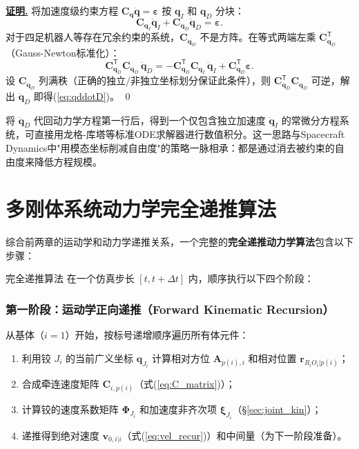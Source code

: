 \documentclass[10pt,a4paper]{book}
\theoremstyle{thmstyle}
\theoremstyle{defstyle}
\theoremstyle{prostyle}
\renewenvironment{proof}[1][证明]{\par{\kaishu \underline{\textbf{#1.}}} \;\fangsong}{\qed\par}
\newcommand{\T}{^{\mathsf{T}}}
\renewcommand{\vec}[1]{\bm{#1}}
\newcommand{\mat}[1]{\bm{#1}}
\begin{document}
\begin{proof}
将加速度级约束方程 $\mat{C}_{\vec{q}}\ddot{\vec{q}} = \vec{\varepsilon}$ 按 $\vec{q}_I$ 和 $\vec{q}_D$ 分块：
\[
\mat{C}_{\vec{q}_I}\ddot{\vec{q}}_I + \mat{C}_{\vec{q}_D}\ddot{\vec{q}}_D = \vec{\varepsilon}.
\]
对于四足机器人等存在冗余约束的系统，$\mat{C}_{\vec{q}_D}$ 不是方阵。在等式两端左乘 $\mat{C}_{\vec{q}_D}\T$（Gauss-Newton标准化）：
\[
\mat{C}_{\vec{q}_D}\T\mat{C}_{\vec{q}_D}\,\ddot{\vec{q}}_D
= -\mat{C}_{\vec{q}_D}\T\mat{C}_{\vec{q}_I}\,\ddot{\vec{q}}_I + \mat{C}_{\vec{q}_D}\T\vec{\varepsilon}.
\]
设 $\mat{C}_{\vec{q}_D}$ 列满秩（正确的独立/非独立坐标划分保证此条件），则 $\mat{C}_{\vec{q}_D}\T\mat{C}_{\vec{q}_D}$ 可逆，解出 $\ddot{\vec{q}}_D$ 即得(\ref{eq:qddotD})。
\end{proof}

将 $\ddot{\vec{q}}_D$ 代回动力学方程第一行后，得到一个仅包含独立加速度 $\ddot{\vec{q}}_I$ 的常微分方程系统，可直接用龙格-库塔等标准ODE求解器进行数值积分。这一思路与Spacecraft Dynamics中"用模态坐标削减自由度"的策略一脉相承：都是通过消去被约束的自由度来降低方程规模。


\chapter{多刚体系统动力学完全递推算法}

综合前两章的运动学和动力学递推关系，一个完整的\textbf{完全递推动力学算法}包含以下步骤：

\begin{mydefinition}{完全递推算法}
在一个仿真步长 $[t, t+\Delta t]$ 内，顺序执行以下四个阶段：
\end{mydefinition}

\subsection*{第一阶段：运动学正向递推（Forward Kinematic Recursion）}

从基体（$i=1$）开始，按标号递增顺序遍历所有体元件：
\begin{enumerate}
    \item 利用铰 $J_i$ 的当前广义坐标 $\vec{q}_{J_i}$ 计算相对方位 $\mat{A}_{p(i),i}$ 和相对位置 $\vec{r}_{R_iO_i|p(i)}$；
    \item 合成牵连速度矩阵 $\mat{C}_{i,p(i)}$（式(\ref{eq:C_matrix})）；
    \item 计算铰的速度系数矩阵 $\mat{\Phi}_{J_i}$ 和加速度非齐次项 $\vec{\xi}_{J_i}$（\S\ref{sec:joint_kin}）；
    \item 递推得到绝对速度 $\vec{v}_{0,i|i}$（式(\ref{eq:vel_recur})）和中间量（为下一阶段准备）。
\end{enumerate}
\end{document}
